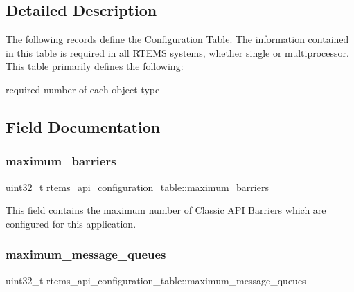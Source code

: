 \subsection{Detailed Description}
The following records define the Configuration Table. The information contained in this table is required in all R\+T\+E\+MS systems, whether single or multiprocessor. This table primarily defines the following\+:


\begin{DoxyItemize}
\item required number of each object type 
\end{DoxyItemize}

\subsection{Field Documentation}
\mbox{\label{structrtems__api__configuration__table_ad266904a40743b519078b5863bdde0f3}} 
\subsubsection{\texorpdfstring{maximum\_barriers}{maximum\_barriers}}
{\footnotesize\ttfamily uint32\+\_\+t rtems\+\_\+api\+\_\+configuration\+\_\+table\+::maximum\+\_\+barriers}

This field contains the maximum number of Classic A\+PI Barriers which are configured for this application. \mbox{\label{structrtems__api__configuration__table_a94ef0a5edf4ef3eafcb5a36a123b78b6}} 
\subsubsection{\texorpdfstring{maximum\_message\_queues}{maximum\_message\_queues}}
{\footnotesize\ttfamily uint32\+\_\+t rtems\+\_\+api\+\_\+configuration\+\_\+table\+::maximum\+\_\+message\+\_\+queues}

